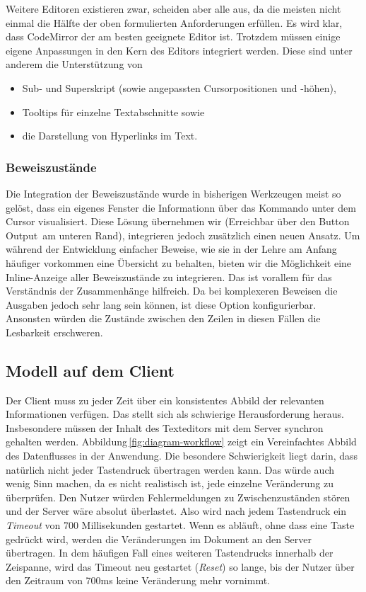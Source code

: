 Weitere Editoren existieren zwar, scheiden aber alle aus, da die meisten nicht einmal die Hälfte der
oben formulierten Anforderungen erfüllen. Es wird klar, dass CodeMirror der am besten geeignete
Editor ist. Trotzdem müssen einige eigene Anpassungen in den Kern des Editors integriert werden.
Diese sind unter anderem die Unterstützung von

\begin{itemize}
  \item Sub- und Superskript (sowie angepassten Cursorpositionen und -höhen),
  \item Tooltips für einzelne Textabschnitte sowie
  \item die Darstellung von Hyperlinks im Text.
\end{itemize}

\subsubsection{Beweiszustände}

Die Integration der Beweiszustände wurde in bisherigen Werkzeugen meist so gelöst, dass ein eigenes
Fenster die Informationn über das Kommando unter dem Cursor visualisiert. Diese Lösung übernehmen
wir (Erreichbar über den Button \glqq Output\grqq\ am unteren Rand), integrieren jedoch zusätzlich
einen neuen Ansatz. Um während der Entwicklung einfacher Beweise, wie sie in der Lehre am Anfang
häufiger vorkommen eine Übersicht zu behalten, bieten wir die Möglichkeit eine Inline-Anzeige aller
Beweiszustände zu integrieren. Das ist vorallem für das Verständnis der Zusammenhänge hilfreich. Da
bei komplexeren Beweisen die Ausgaben jedoch sehr lang sein können, ist diese Option konfigurierbar.
Ansonsten würden die Zustände zwischen den Zeilen in diesen Fällen die Lesbarkeit erschweren.

\subsection{Modell auf dem Client}

Der Client muss zu jeder Zeit über ein konsistentes Abbild der relevanten Informationen verfügen.
Das stellt sich als schwierige Herausforderung heraus. Insbesondere müssen der Inhalt des
Texteditors mit dem Server synchron gehalten werden. Abbildung\,\ref{fig:diagram-workflow} zeigt ein
Vereinfachtes Abbild des Datenflusses in der Anwendung. Die besondere Schwierigkeit liegt darin,
dass natürlich nicht jeder Tastendruck übertragen werden kann. Das würde auch wenig Sinn machen, da
es nicht realistisch ist, jede einzelne Veränderung zu überprüfen. Den Nutzer würden Fehlermeldungen
zu Zwischenzuständen stören und der Server wäre absolut überlastet. Also wird nach jedem Tastendruck
ein \textit{Timeout} von 700 Millisekunden gestartet. Wenn es abläuft, ohne dass eine Taste gedrückt
wird, werden die Veränderungen im Dokument an den Server übertragen. In dem häufigen Fall eines
weiteren Tastendrucks innerhalb der Zeispanne, wird das Timeout neu gestartet (\textit{Reset}) so
lange, bis der Nutzer über den Zeitraum von 700ms keine Veränderung mehr vornimmt.

